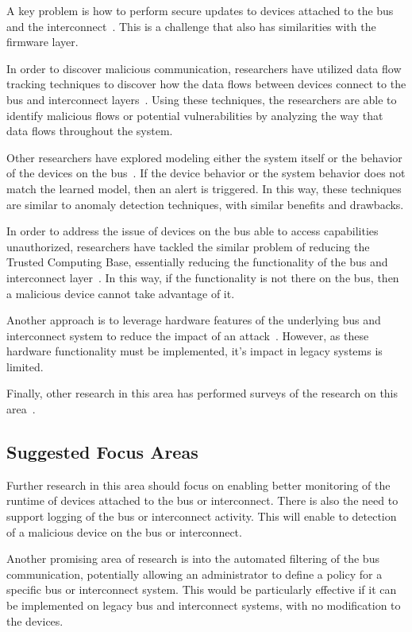 \documentclass[11pt,letterpaper]{article}
\begin{document}
A key problem is how to perform secure updates to devices attached to
the bus and the interconnect~\cite{Larson2008}. This is a challenge
that also has similarities with the firmware layer.

In order to discover malicious communication, researchers have
utilized data flow tracking techniques to discover how the data flows
between devices connect to the bus and interconnect
layers~\cite{Schweppe2012}. Using these techniques, the researchers
are able to identify malicious flows or potential vulnerabilities by
analyzing the way that data flows throughout the system.

Other researchers have explored modeling either the system itself
or the behavior of the devices on the bus~\cite{Stewin2013a,
  Drolia2011}. If the device behavior or the system behavior does not
match the learned model, then an alert is triggered. In this way,
these techniques are similar to anomaly detection techniques, with
similar benefits and drawbacks. 

In order to address the issue of devices on the bus able to access
capabilities unauthorized, researchers have tackled the similar
problem of reducing the Trusted Computing Base, essentially reducing
the functionality of the bus and interconnect
layer~\cite{Vasudevan2012, Zhang2013, Zhou2009}. In this way, if the
functionality is not there on the bus, then a malicious device cannot
take advantage of it.

Another approach is to leverage hardware features of the underlying
bus and interconnect system to reduce the impact of an
attack~\cite{Wolf2012, Wojtczuk2011}. However, as these hardware
functionality must be implemented, it's impact in legacy systems is
limited.

Finally, other research in this area has performed surveys of the
research on this area~\cite{Kleberger2011, Studnia2013, Thom2008,
  Wolf2004, Wolf2007, Wright2011, Zhao2002}.

\subsection{Suggested Focus Areas}

Further research in this area should focus on enabling better
monitoring of the runtime of devices attached to the bus or
interconnect. There is also the need to support logging of the bus or
interconnect activity. This will enable to detection of a malicious
device on the bus or interconnect.

Another promising area of research is into the automated filtering of
the bus communication, potentially allowing an administrator to define
a policy for a specific bus or interconnect system. This would be
particularly effective if it can be implemented on legacy bus and
interconnect systems, with no modification to the devices.
\end{document}
